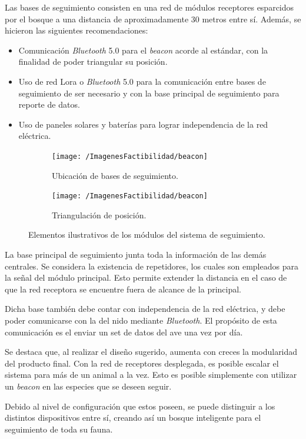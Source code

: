Las bases de seguimiento consisten en una red de módulos receptores esparcidos por el bosque a una distancia de aproximadamente 30 metros entre sí.
Además, se hicieron las siguientes recomendaciones:
\begin{itemize}
	\item Comunicación \textit{Bluetooth} 5.0 para el \textit{beacon} acorde al estándar, con la finalidad de poder triangular su posición.
	\item Uso de red Lora o \textit{Bluetooth} 5.0 para la comunicación entre bases de seguimiento de ser necesario y con la base principal de seguimiento para reporte de datos.
	\item Uso de paneles solares y baterías para lograr independencia de la red eléctrica.
\end{itemize}
\begin{figure}[H]
\centering
	\begin{subfigure}{0.5\textwidth}
    	\centering
    	\texttt{[image: /ImagenesFactibilidad/beacon]}
  		\caption{Ubicación de bases de seguimiento.}
  		\label{fig:sfig1}
    \end{subfigure}\hfill
    \begin{subfigure}{0.5\textwidth}
    	\centering
    	\texttt{[image: /ImagenesFactibilidad/beacon]}
  		\caption{Triangulación de posición.}
  		\label{fig:sfig2}
    \end{subfigure}
	\caption{Elementos ilustrativos de los módulos del sistema de seguimiento.}
	\label{fig:componentes_beacon}
\end{figure}

La base principal de seguimiento junta toda la información de las demás centrales. Se considera la existencia de repetidores, los cuales son empleados para la señal del módulo principal. Esto permite extender la distancia en el caso de que la red receptora se encuentre fuera de alcance de la principal.

Dicha base también debe contar con independencia de la red eléctrica, y debe poder comunicarse con la del nido mediante \textit{Bluetooth}. El propósito de esta comunicación es el enviar un set de datos del ave una vez por día.

Se destaca que, al realizar el diseño sugerido, aumenta con creces la modularidad del producto final. Con la red de receptores desplegada, es posible escalar el sistema para más de un animal a la vez. Esto es posible simplemente con utilizar un \textit{beacon} en las especies que se deseen seguir. 

Debido al nivel de configuración que estos poseen, se puede distinguir a los distintos dispositivos entre sí, creando así un bosque inteligente para el seguimiento de toda su fauna.
